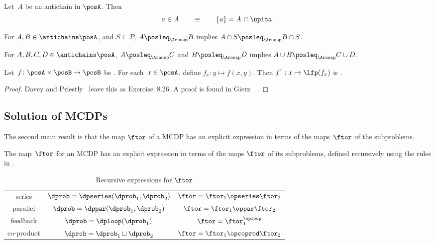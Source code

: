 \begin{lemma}
\label{lem:antichain-write}Let~$A$ be an antichain in $\posA$.
Then
\[
a\in A\qquad\equiv\qquad\{a\}=A\,\cap\upit a.
\]
\end{lemma}

\begin{lemma}
\label{lem:antichain_inter}For $A,B\in\antichains\posA$, and $S\subseteq P$,
$A\posleq_{\Aressp}B$ implies $A\cap S\posleq_{\Aressp}B\cap S$.
\end{lemma}

\begin{lemma}
\label{lem:antichain_union}For $A,B,C,D\in\antichains\posA$, $A\posleq_{\Aressp}C$
and $B\posleq_{\Aressp}D$ implies $A\cup B\posleq_{\Aressp}C\cup D.$
\end{lemma}

\begin{lemma}
\label{lem:dagger}Let~$f\colon\posA\times\posB\rightarrow\posB$
be \scottcontinuous. For each~$x\in\posA$, define $f_{x}:y\mapsto f(x,y).$
Then $f^{\dagger}:x\mapsto\lfp(f_{x})$ is \scottcontinuous.
\end{lemma}
\begin{proof}
Davey and Priestly~\cite{davey02} leave this as Exercise~8.26.
A proof is found in Gierz~\etal~\cite[Exercise II-2.29]{gierz03continuous}.
\end{proof}




\subsection{Solution of MCDPs\label{sec:Solution-of-Monotone}}

The second main result is that the map $\ftor$ of a MCDP has an explicit
expression in terms of the maps~$\ftor$ of the subproblems.

\noindent

\begin{theorem}
\label{thm:CDP-solvig}The map~$\ftor$ for an MCDP has an explicit
expression in terms of the maps $\ftor$ of its subproblems, defined
recursively using the rules in .
\end{theorem}

\begin{table}[h]
\begin{centering}
\caption{Recursive expressions for $\ftor$\label{tab:Correspondence}}
\par\end{centering}
\centering{}\setlength\extrarowheight{5pt}\normalsize
\begin{tabular}{ccc}
series & $\dprob=\dpseries(\dprob_{1},\dprob_{2})$ & $\ftor=\ftor_{1}\opseries\ftor_{2}$\tabularnewline
parallel & $\dprob=\dppar(\dprob_{1},\dprob_{2})$ & $\ftor=\ftor_{1}\oppar\ftor_{2}$\tabularnewline
feedback & $\dprob=\dploop(\dprob_{1})$ & $\ftor=\ftor_{1}^{\oploop}$\tabularnewline
co-product & $\dprob=\dprob_{1}\sqcup\dprob_{2}$ & $\ftor=\ftor_{1}\opcoprod\ftor_{2}$\tabularnewline
\end{tabular}
\end{table}

